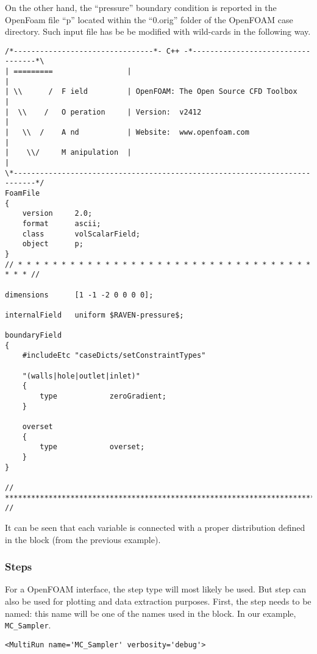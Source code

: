 On the other hand, the ``pressure'' boundary condition is reported in the OpenFoam file ``p'' located within the ``0.orig'' folder of the OpenFOAM case directory.
Such input file has be be modified with wild-cards in the following way.
\begin{lstlisting}[basicstyle=\tiny]
/*--------------------------------*- C++ -*----------------------------------*\
| =========                 |                                                 |
| \\      /  F ield         | OpenFOAM: The Open Source CFD Toolbox           |
|  \\    /   O peration     | Version:  v2412                                 |
|   \\  /    A nd           | Website:  www.openfoam.com                      |
|    \\/     M anipulation  |                                                 |
\*---------------------------------------------------------------------------*/
FoamFile
{
    version     2.0;
    format      ascii;
    class       volScalarField;
    object      p;
}
// * * * * * * * * * * * * * * * * * * * * * * * * * * * * * * * * * * * * * //

dimensions      [1 -1 -2 0 0 0 0];

internalField   uniform $RAVEN-pressure$;

boundaryField
{
    #includeEtc "caseDicts/setConstraintTypes"

    "(walls|hole|outlet|inlet)"
    {
        type            zeroGradient;
    }

    overset
    {
        type            overset;
    }
}

// ************************************************************************* //
\end{lstlisting}

\noindent It can be seen that each variable is connected with a proper distribution
defined in the \xmlNode{Distributions} block (from the previous example).

\subsubsection{Steps}
For a OpenFOAM interface, the  step type will most likely be
used. But \xmlNode{SingleRun} step can also be used for plotting and data extraction purposes.
%
First, the step needs to be named: this name will be one of the names used in
the \xmlNode{sequence} block.
%
In our example,  \texttt{MC\_Sampler}.
%
\begin{lstlisting}[style=XML,morekeywords={name,debug,re-seeding}]
     <MultiRun name='MC_Sampler' verbosity='debug'>
\end{lstlisting}

